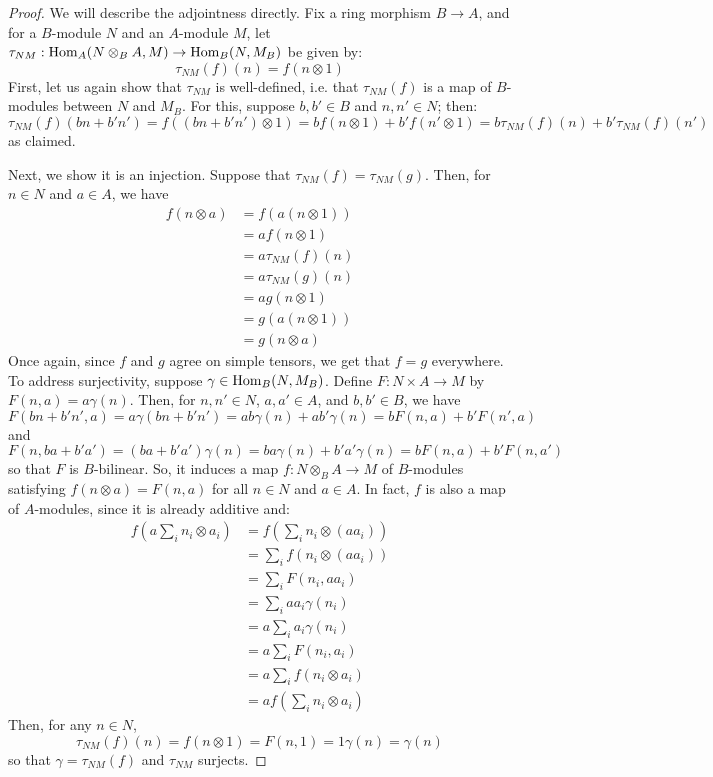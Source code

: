 \documentclass[12pt]{exam}
\begin{document}
\begin{proof}
	We will describe the adjointness directly. Fix a ring morphism $B \to A$, and for a $B$-module $N$ and an $A$-module $M$, let $\tau_{NM} : \operatorname{Hom}_A(N \otimes_B A,M) \to \operatorname{Hom}_B(N,M_B)$ be given by:
	\[ \tau_{NM}(f)(n) = f(n \otimes 1) \]
	First, let us again show that $\tau_{NM}$ is well-defined, i.e. that $\tau_{NM}(f)$ is a map of $B$-modules between $N$ and $M_B$. For this, suppose $b,b' \in B$ and $n,n' \in N$; then:
	\[ \tau_{NM}(f)(bn+b'n') = f((bn+b'n') \otimes 1) = bf(n \otimes 1)+b'f(n' \otimes 1) = b\tau_{NM}(f)(n)+b'\tau_{NM}(f)(n') \]
	as claimed.
	
	Next, we show it is an injection. Suppose that $\tau_{NM}(f) = \tau_{NM}(g)$. Then, for $n \in N$ and $a \in A$, we have
	\begin{align*}
	f(n \otimes a)
		&= f(a(n \otimes 1)) \\
		&= af(n \otimes 1) \\
		&= a\tau_{NM}(f)(n) \\
		&= a\tau_{NM}(g)(n) \\
		&= ag(n \otimes 1) \\
		&= g(a(n \otimes 1)) \\
		&= g(n \otimes a)
	\end{align*}
	Once again, since $f$ and $g$ agree on simple tensors, we get that $f = g$ everywhere. To address surjectivity, suppose $\gamma \in \operatorname{Hom}_B(N,M_B)$. Define $F : N \times A \to M$ by $F(n,a) = a\gamma(n)$. Then, for $n,n' \in N$, $a,a' \in A$, and $b,b' \in B$, we have
	\[ F(bn+b'n',a) = a\gamma(bn+b'n') = ab\gamma(n)+ab'\gamma(n) = bF(n,a)+b'F(n',a) \]
	and
	\[ F(n,ba+b'a') = (ba+b'a')\gamma(n) = ba\gamma(n)+b'a'\gamma(n) = bF(n,a)+b'F(n,a') \]
	so that $F$ is $B$-bilinear. So, it induces a map $f : N \otimes_B A \to M$ of $B$-modules satisfying $f(n \otimes a) = F(n,a)$ for all $n \in N$ and $a \in A$. In fact, $f$ is also a map of $A$-modules, since it is already additive and:
	\begin{align*}
	f\left(a\sum_i n_i \otimes a_i\right)
		&= f\left(\sum_i n_i \otimes (aa_i)\right) \\
		&= \sum_i f(n_i \otimes (aa_i)) \\
		&= \sum_i F(n_i,aa_i) \\
		&= \sum_i aa_i\gamma(n_i) \\
		&= a\sum_i a_i\gamma(n_i) \\
		&= a\sum_i F(n_i,a_i) \\
		&= a\sum_i f(n_i \otimes a_i) \\
		&= af\left(\sum_i n_i \otimes a_i\right)
	\end{align*}
	Then, for any $n \in N$,
	\[ \tau_{NM}(f)(n) = f(n \otimes 1) = F(n,1) = 1\gamma(n) = \gamma(n) \]
	so that $\gamma = \tau_{NM}(f)$ and $\tau_{NM}$ surjects.
	

\end{proof}
\end{document}
